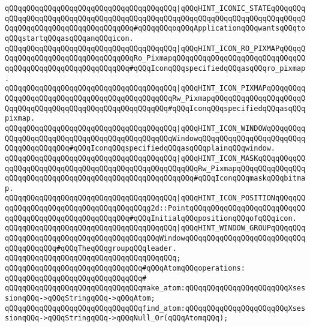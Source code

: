 \verb|qQQqqQQqqQQqqQQqqQQqqQQqqQQqqQQqqQQqqQQq|\verb#|qQQqHINT_ICONIC_STATEqQQqqQQqqQQqqQQqqQQqqQQqqQQqqQQqqQQqqQQqqQQqqQQqqQQqqQQqqQQqqQQqqQQqqQQqqQQqqQQqqQQqqQQqqQQqqQQqqQQqqQQqqQQq#\verb|#qQQqqQQqoqQQqApplicationqQQqwantsqQQqtoqQQqstartqQQqasqQQqanqQQqicon.|\newline
\verb|qQQqqQQqqQQqqQQqqQQqqQQqqQQqqQQqqQQqqQQq|\verb#|qQQqHINT_ICON_RO_PIXMAPqQQqqQQqqQQqqQQqqQQqqQQqqQQqqQQqqQQqRo_PixmapqQQqqQQqqQQqqQQqqQQqqQQqqQQqqQQqqQQqqQQqqQQqqQQqqQQqqQQqqQQq#\verb|#qQQqIconqQQqspecifiedqQQqasqQQqro_pixmap.|\newline
\verb|qQQqqQQqqQQqqQQqqQQqqQQqqQQqqQQqqQQqqQQq|\verb#|qQQqHINT_ICON_PIXMAPqQQqqQQqqQQqqQQqqQQqqQQqqQQqqQQqqQQqqQQqqQQqqQQqRw_PixmapqQQqqQQqqQQqqQQqqQQqqQQqqQQqqQQqqQQqqQQqqQQqqQQqqQQqqQQqqQQq#\verb|#qQQqIconqQQqspecifiedqQQqasqQQqpixmap.|\newline
\verb|qQQqqQQqqQQqqQQqqQQqqQQqqQQqqQQqqQQqqQQq|\verb#|qQQqHINT_ICON_WINDOWqQQqqQQqqQQqqQQqqQQqqQQqqQQqqQQqqQQqqQQqqQQqqQQqWindowqQQqqQQqqQQqqQQqqQQqqQQqqQQqqQQqqQQqqQQq#\verb|#qQQqIconqQQqspecifiedqQQqasqQQqplainqQQqwindow.|\newline
\verb|qQQqqQQqqQQqqQQqqQQqqQQqqQQqqQQqqQQqqQQq|\verb#|qQQqHINT_ICON_MASKqQQqqQQqqQQqqQQqqQQqqQQqqQQqqQQqqQQqqQQqqQQqqQQqqQQqqQQqRw_PixmapqQQqqQQqqQQqqQQqqQQqqQQqqQQqqQQqqQQqqQQqqQQqqQQqqQQqqQQqqQQq#\verb|#qQQqIconqQQqmaskqQQqbitmap.|\newline
\verb|qQQqqQQqqQQqqQQqqQQqqQQqqQQqqQQqqQQqqQQq|\verb#|qQQqHINT_ICON_POSITIONqQQqqQQqqQQqqQQqqQQqqQQqqQQqqQQqqQQqqQQqg2d::PointqQQqqQQqqQQqqQQqqQQqqQQqqQQqqQQqqQQqqQQqqQQqqQQqqQQqqQQq#\verb|#qQQqInitialqQQqpositionqQQqofqQQqicon.|\newline
\verb|qQQqqQQqqQQqqQQqqQQqqQQqqQQqqQQqqQQqqQQq|\verb#|qQQqHINT_WINDOW_GROUPqQQqqQQqqQQqqQQqqQQqqQQqqQQqqQQqqQQqqQQqqQQqWindowqQQqqQQqqQQqqQQqqQQqqQQqqQQqqQQqqQQqqQQq#\verb|#qQQqTheqQQqgroupqQQqleader.|\newline
\verb|qQQqqQQqqQQqqQQqqQQqqQQqqQQqqQQqqQQqqQQq;|\newline
\newline
\verb|qQQqqQQqqQQqqQQqqQQqqQQqqQQqqQQq#qQQqAtomqQQqoperations:|\newline
\verb|qQQqqQQqqQQqqQQqqQQqqQQqqQQqqQQq#|\newline
\verb|qQQqqQQqqQQqqQQqqQQqqQQqqQQqqQQqmake_atom:qQQqqQQqqQQqqQQqqQQqqQQqXsessionqQQq->qQQqStringqQQq->qQQqAtom;|\newline
\verb|qQQqqQQqqQQqqQQqqQQqqQQqqQQqqQQqfind_atom:qQQqqQQqqQQqqQQqqQQqqQQqXsessionqQQq->qQQqStringqQQq->qQQqNull_Or(qQQqAtomqQQq);|\newline
